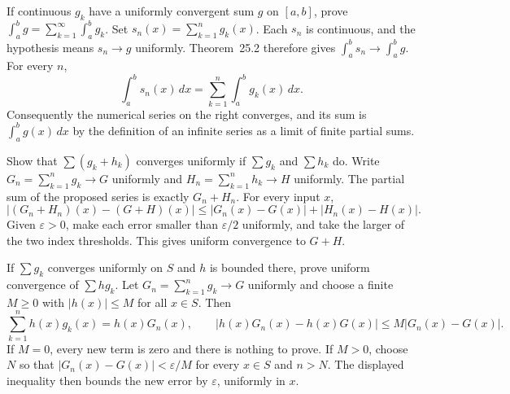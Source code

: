 \goal If continuous $g_k$ have a uniformly convergent sum $g$ on $[a,b]$,
prove $\int_a^b g=\sum_{k=1}^\infty\int_a^b g_k$.
Set $s_n(x)=\sum_{k=1}^n g_k(x)$.
Each $s_n$ is continuous, and the hypothesis means $s_n\to g$ uniformly.
Theorem~25.2 therefore gives $\int_a^b s_n\to\int_a^b g$.
For every $n$,
\[
 \int_a^b s_n(x)\,dx=\sum_{k=1}^n\int_a^b g_k(x)\,dx.
\]
Consequently the numerical series on the right converges, and its sum is
$\int_a^b g(x)\,dx$ by the definition of an infinite series as a limit of
finite partial sums.

\goal Show that $\sum(g_k+h_k)$ converges uniformly if $\sum g_k$ and $\sum h_k$ do.
Write $G_n=\sum_{k=1}^n g_k\to G$ uniformly and
$H_n=\sum_{k=1}^n h_k\to H$ uniformly.
The partial sum of the proposed series is exactly $G_n+H_n$.
For every input $x$,
\[
 |(G_n+H_n)(x)-(G+H)(x)|
 \le|G_n(x)-G(x)|+|H_n(x)-H(x)|.
\]
Given $\varepsilon>0$, make each error smaller than $\varepsilon/2$
uniformly, and take the larger of the two index thresholds.
This gives uniform convergence to $G+H$.

\goal If $\sum g_k$ converges uniformly on $S$ and $h$ is bounded there,
prove uniform convergence of $\sum hg_k$.
Let $G_n=\sum_{k=1}^n g_k\to G$ uniformly and choose a finite $M\ge0$ with
$|h(x)|\le M$ for all $x\in S$. Then
\[
 \sum_{k=1}^n h(x)g_k(x)=h(x)G_n(x),\qquad
 |h(x)G_n(x)-h(x)G(x)|\le M|G_n(x)-G(x)|.
\]
If $M=0$, every new term is zero and there is nothing to prove.
If $M>0$, choose $N$ so that $|G_n(x)-G(x)|<\varepsilon/M$ for every
$x\in S$ and $n>N$. The displayed inequality then bounds the new error
by $\varepsilon$, uniformly in $x$.

